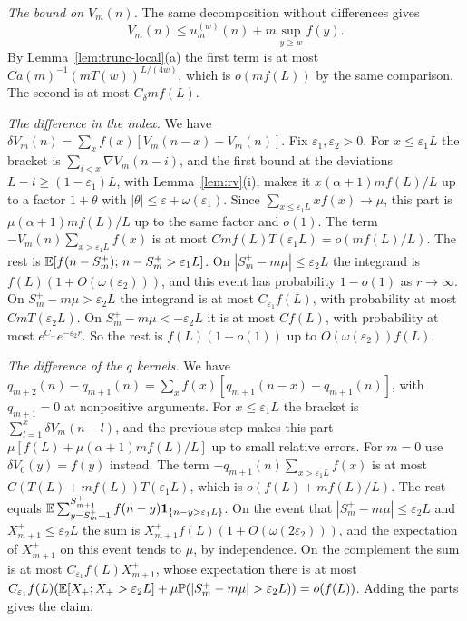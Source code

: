 \emph{The bound on $V_m(n)$.} The same decomposition without differences gives
\[
 V_m(n)\le u^{(w)}_m(n)+m\sup_{y\ge w}f(y).
\]
By Lemma~\ref{lem:trunc-local}(a) the first term is at most $Ca(m)^{-1}(mT(w))^{L/(4w)}$, which
is $o(mf(L))$ by the same comparison. The second is at most $C_\delta mf(L)$.

\emph{The difference in the index.} We have $\delta V_m(n)=\sum_xf(x)[V_m(n-x)-V_m(n)]$. Fix
$\varepsilon_1,\varepsilon_2>0$. For $x\le\varepsilon_1L$ the bracket is
$\sum_{i<x}\nabla V_m(n-i)$, and the first bound at the deviations $L-i\ge(1-\varepsilon_1)L$,
with Lemma~\ref{lem:rv}(i), makes it $x(\alpha+1)mf(L)/L$ up to a factor $1+\theta$ with
$|\theta|\le\varepsilon+\omega(\varepsilon_1)$. Since $\sum_{x\le\varepsilon_1L}xf(x)\to\mu$, this
part is $\mu(\alpha+1)mf(L)/L$ up to the same factor and $o(1)$. The term
$-V_m(n)\sum_{x>\varepsilon_1L}f(x)$ is at most $Cmf(L)T(\varepsilon_1L)=o(mf(L)/L)$. The rest is
$\mathbb{E}[f(n-S^{+}_m);\,n-S^{+}_m>\varepsilon_1L]$. On $|S^\plus_m-m\mu|\le\varepsilon_2L$ the
integrand is $f(L)(1+O(\omega(\varepsilon_2)))$, and this event has probability $1-o(1)$ as
$r\to\infty$. On $S^\plus_m-m\mu>\varepsilon_2L$ the integrand is at most $C_{\varepsilon_1}f(L)$,
with probability at most $CmT(\varepsilon_2L)$. On $S^\plus_m-m\mu<-\varepsilon_2L$ it is at most
$Cf(L)$, with probability at most $e^{C_-}e^{-\varepsilon_2r}$. So the rest is $f(L)(1+o(1))$ up
to $O(\omega(\varepsilon_2))f(L)$.

\emph{The difference of the $q$ kernels.} We have
$q_{m+2}(n)-q_{m+1}(n)=\sum_xf(x)[q_{m+1}(n-x)-q_{m+1}(n)]$, with $q_{m+1}=0$ at nonpositive
arguments. For $x\le\varepsilon_1L$ the bracket is $\sum_{l=1}^x\delta V_m(n-l)$, and the previous
step makes this part $\mu[f(L)+\mu(\alpha+1)mf(L)/L]$ up to small relative errors. For $m=0$ use
$\delta V_0(y)=f(y)$ instead. The term $-q_{m+1}(n)\sum_{x>\varepsilon_1L}f(x)$ is at most
$C(T(L)+mf(L))T(\varepsilon_1L)$, which is $o(f(L)+mf(L)/L)$. The rest equals
$\mathbb{E}\sum_{y=S^{+}_m+1}^{S^{+}_{m+1}}f(n-y)\mathbf{1}_{\{n-y>\varepsilon_1L\}}$. On the event that
$|S^\plus_m-m\mu|\le\varepsilon_2L$ and $X^\plus_{m+1}\le\varepsilon_2L$ the sum is
$X^\plus_{m+1}f(L)(1+O(\omega(2\varepsilon_2)))$, and the expectation of $X^\plus_{m+1}$ on this
event tends to $\mu$, by independence. On the complement the sum is at most
$C_{\varepsilon_1}f(L)X^\plus_{m+1}$, whose expectation there is at most
$C_{\varepsilon_1}f(L)(\E[X_\plus;X_\plus>\varepsilon_2L]+\mu\Prob(|S^\plus_m-m\mu|>\varepsilon_2L))=o(f(L))$.
Adding the parts gives the claim.


